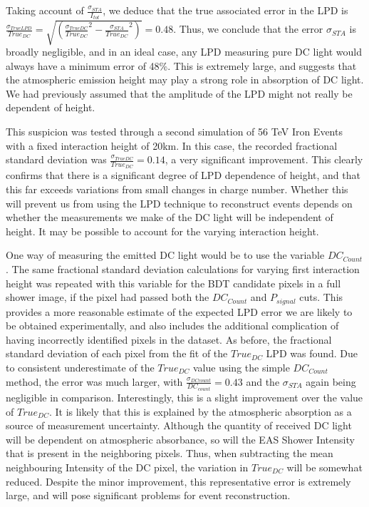 \documentclass[11pt]{article}
\begin{document}
Taking account of $\frac{\sigma_{STA}}{I_{tot}}$, we deduce that the true associated error in the LPD is $\frac{\sigma_{TrueLPD}}{{True_{DC}}} = \sqrt{(\frac{\sigma_{TrueDC}}{True_{DC}}^{2} - \frac{\sigma_{STA}}{{True_{DC}}}^{2})} = 0.48$. Thus, we conclude that the error $\sigma_{STA}$ is broadly negligible, and in an ideal case, any LPD measuring pure DC light would always have a minimum error of 48\%. This is extremely large, and suggests that the atmospheric emission height may play a strong role in absorption of DC light. We had previously assumed that the amplitude of the LPD might not really be dependent of height. 

This suspicion was tested through a second simulation of 56 TeV Iron Events with a fixed interaction height of 20km. In this case, the recorded fractional standard deviation was $\frac{\sigma_{TrueDC}}{True_{DC}}=0.14$, a very significant improvement. This clearly confirms that there is a significant degree of LPD dependence of height, and that this far exceeds variations from small changes in charge number. Whether this will prevent us from using the LPD technique to reconstruct events depends on whether the measurements we make of the DC light will be independent of height. It may be possible to account for the varying interaction height.

One way of measuring the emitted DC light would be to use the variable $DC_{Count}$. The same fractional standard deviation calculations for varying first interaction height was repeated with this variable for the BDT candidate pixels in a full shower image, if the pixel had passed both the $DC_{Count}$ and $P_{signal}$ cuts. This provides a more reasonable estimate of the expected LPD error we are likely to be obtained experimentally, and also includes the additional complication of having incorrectly identified pixels in the dataset. As before, the fractional standard deviation of each pixel from the fit of the $True_{DC}$ LPD was found. Due to consistent underestimate of the $True_{DC}$ value using the simple $DC_{Count}$ method, the error was much larger, with $\frac{\sigma_{DCcount}}{DC_{count}}=0.43$ and the $\sigma_{STA}$ again being negligible in comparison. Interestingly, this is a slight improvement over the value of $True_{DC}$. It is likely that this is explained by the atmospheric absorption as a source of measurement uncertainty. Although the quantity of received DC light will be dependent on atmospheric absorbance, so will the EAS Shower Intensity that is present in the neighboring pixels. Thus, when subtracting the mean neighbouring Intensity of the DC pixel, the variation in $True_{DC}$ will be somewhat reduced. Despite the minor improvement, this representative error is extremely large, and will pose significant problems for event reconstruction. 
\end{document}
